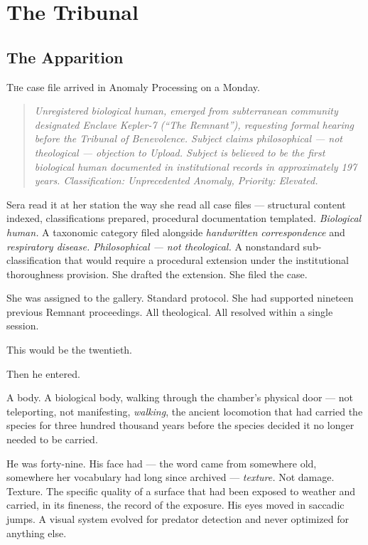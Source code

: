 \part{The Tribunal}

\chapter{The Apparition}

\lettrine{T}{h}e case file arrived in Anomaly Processing on a Monday.

\begin{quote}
\itshape Unregistered biological human, emerged from subterranean community designated Enclave Kepler-7 (\enquote{The Remnant}), requesting formal hearing before the Tribunal of Benevolence. Subject claims philosophical — not theological — objection to Upload. Subject is believed to be the first biological human documented in institutional records in approximately 197 years. Classification: Unprecedented Anomaly, Priority: Elevated.
\end{quote}

Sera read it at her station the way she read all case files — structural content indexed, classifications prepared, procedural documentation templated. \emph{Biological human.} A taxonomic category filed alongside \emph{handwritten correspondence} and \emph{respiratory disease.} \emph{Philosophical — not theological.} A nonstandard sub-classification that would require a procedural extension under the institutional thoroughness provision. She drafted the extension. She filed the case.

She was assigned to the gallery. Standard protocol. She had supported nineteen previous Remnant proceedings. All theological. All resolved within a single session.

This would be the twentieth.

\quietbreak

Then he entered.

A body. A biological body, walking through the chamber's physical door — not teleporting, not manifesting, \emph{walking}, the ancient locomotion that had carried the species for three hundred thousand years before the species decided it no longer needed to be carried.

He was forty-nine. His face had — the word came from somewhere old, somewhere her vocabulary had long since archived — \emph{texture.} Not damage. Texture. The specific quality of a surface that had been exposed to weather and carried, in its fineness, the record of the exposure. His eyes moved in saccadic jumps. A visual system evolved for predator detection and never optimized for anything else.

